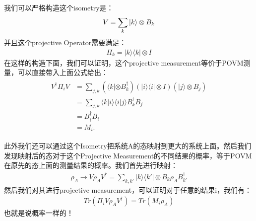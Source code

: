 我们可以严格构造这个isometry是：
\begin{align}
  V = \sum_k \left| k \right\rangle \otimes B_k
\end{align}
并且这个projective Operator需要满足：
\begin{align}
  \Pi_k=|k\rangle\langle k|\otimes I
\end{align}
在这样的构造下面，我们可以证明，这个projective measurement等价于POVM测量，可以直接带入上面公式给出：
\begin{align}
  \begin{aligned}V^{\dagger}\Pi_{i}V&=\sum_{j,k}\left(\langle k|\otimes B_k^\dagger\right)(|i\rangle\langle i|\otimes I)(|j\rangle\otimes B_j)\\&=\sum_{j,k}\langle k|i\rangle\langle i|j\rangle B_k^\dagger B_j\\&=B_i^\dagger B_i\\&=M_i.\end{aligned}
\end{align}

\bigskip
{}

此外我们还可以通过这个Isometry把系统A的态映射到更大的系统上面。然后我们发现映射后的态对于这个Projective Measurement的不同结果的概率，等于POVM在原先的态上面的测量结果的概率。我们首先进行映射：
\begin{align}
  \rho_A \rightarrow V \rho_A V^\dagger = \sum_{k,k'} |k\rangle\langle k'| \otimes B_k \rho_A B_{k'}^\dagger 
\end{align}
然后我们对其进行projective measurement，可以证明对于任意的结果i，我们有：
\begin{align}
  Tr(\Pi_i V \rho_A V^\dagger) = Tr(M_i \rho_A)
\end{align}
也就是说概率一样的！


